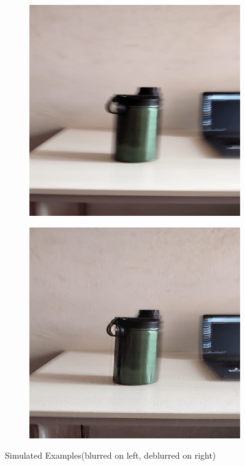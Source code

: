 \documentclass[10pt,twocolumn,letterpaper]{article}
\begin{document}
\vspace{-1cm}
\begin{figure}[h]
  \centering
  \begin{subfigure}{.5\columnwidth}
    \centering
    \includegraphics[width=\linewidth]{images/bottle.png}
  \end{subfigure}%
  \hfill
  \begin{subfigure}{.5\columnwidth}
    \centering
    \includegraphics[width=\linewidth]{images/bottle_db.png}
  \end{subfigure}%
  \hfill
  \caption{Simulated Examples(blurred on left, deblurred on right)}
  \label{fig:real_pic}
\end{figure}
\end{document}
